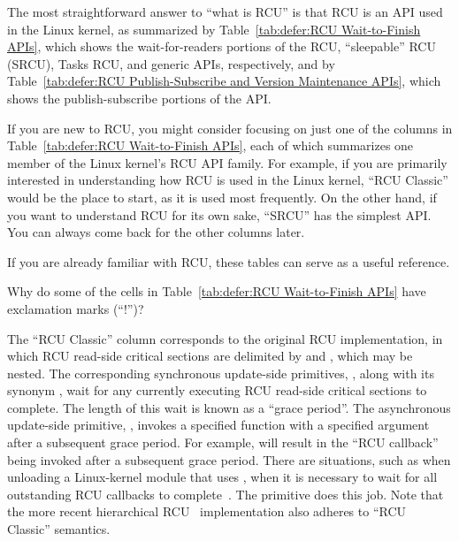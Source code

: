 The most straightforward answer to ``what is RCU'' is that RCU is
an API used in the Linux kernel, as summarized by
Table~\ref{tab:defer:RCU Wait-to-Finish APIs},
which shows the wait-for-readers portions of the RCU, ``sleepable'' RCU
(SRCU), Tasks RCU, and generic APIs, respectively,
and by
Table~\ref{tab:defer:RCU Publish-Subscribe and Version Maintenance APIs},
which shows the publish-subscribe portions of the API.



If you are new to RCU, you might consider focusing on just one
of the columns in
Table~\ref{tab:defer:RCU Wait-to-Finish APIs},
each of which summarizes one member of the Linux kernel's RCU API family.
For example, if you are primarily interested in understanding how RCU
is used in the Linux kernel, ``RCU Classic'' would be the place to start,
as it is used most frequently.
On the other hand, if you want to understand RCU for its own sake,
``SRCU'' has the simplest API.
You can always come back for the other columns later.

If you are already familiar with RCU, these tables can
serve as a useful reference.

\QuickQuiz{}
	Why do some of the cells in
	Table~\ref{tab:defer:RCU Wait-to-Finish APIs}
	have exclamation marks (``!'')?
 \QuickQuizEnd

The ``RCU Classic'' column corresponds to the original RCU implementation,
in which RCU read-side critical sections are delimited by
 and , which
may be nested.
The corresponding synchronous update-side primitives,
, along with its synonym
, wait for any currently executing
RCU read-side critical sections to complete.
The length of this wait is known as a ``grace period''.
The asynchronous update-side primitive, ,
invokes a specified function with a specified argument after a
subsequent grace period.
For example,  will result in
the ``RCU callback'' 
being invoked after a subsequent grace period.
There are situations,
such as when unloading a Linux-kernel module that uses ,
when it is necessary to wait for all
outstanding RCU callbacks to complete~\cite{PaulEMcKenney2007rcubarrier}.
The  primitive does this job.
Note that the more recent hierarchical
RCU~\cite{PaulEMcKenney2008HierarchicalRCU}
implementation also adheres to ``RCU Classic'' semantics.

